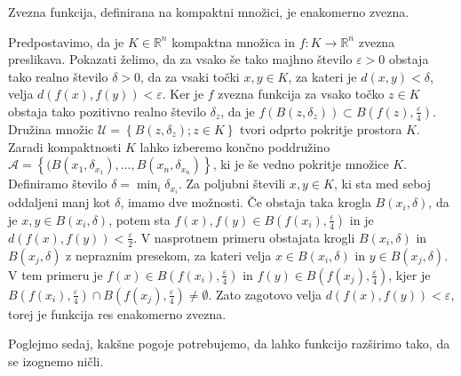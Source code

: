 \documentclass[mat1]{fmfdelo}
\newcommand{\R}{\mathbb R}
\newcommand{\0}{0}
\newcommand{\pA}{\mathcal A}
\newcommand{\pU}{\mathcal U}
\begin{document}
\begin{trditev}\label{trd:zvjeenakzv}
Zvezna funkcija, definirana na kompaktni množici, je enakomerno zvezna.
\end{trditev}
\begin{dokaz}
Predpostavimo, da je $K \in \R^n$ kompaktna množica in $f : K \to \R^n$ zvezna preslikava. Pokazati želimo, da za vsako še tako majhno število $\varepsilon > 0$ obstaja tako realno število $\delta > 0$, da za vsaki točki $x, y \in K$, za kateri je $d(x, y) < \delta$, velja $d(f(x), f(y)) < \varepsilon$. Ker je $f$ zvezna funkcija za vsako točko $z \in K$ obstaja tako pozitivno realno število $\delta_z$, da je $f(B(z, \delta_z)) \subset B(f(z), \frac{\varepsilon}{4})$. Družina množic $\pU = \left \{ B(z, \delta_z); z \in K \right \}$ tvori odprto pokritje prostora $K$. Zaradi kompaktnosti $K$ lahko izberemo končno poddružino $\pA =  \left \{ (B(x_1, \delta_{x_1}), \dots, B(x_n, \delta_{x_n}) \right \}$, ki je še vedno pokritje množice $K$. Definiramo število $\delta = \min_i \delta_{x_i}$. Za poljubni števili $x, y \in K$, ki sta med seboj oddaljeni manj kot $\delta$, imamo dve možnosti. Če obstaja taka krogla $B(x_i, \delta)$, da je $x, y \in B(x_i, \delta)$, potem sta $f(x), f(y) \in B(f(x_i), \frac{\varepsilon}{4})$ in je $d(f(x), f(y)) < \frac{\varepsilon}{2}$. V nasprotnem primeru obstajata krogli  $B(x_i, \delta)$ in $B(x_j, \delta)$ z nepraznim presekom, za kateri velja $x \in B(x_i, \delta)$ in $y \in B(x_j, \delta)$. V tem primeru je $f(x) \in B(f(x_i), \frac{\varepsilon}{4})$ in $f(y) \in B(f(x_j), \frac{\varepsilon}{4})$, kjer je $B(f(x_i), \frac{\varepsilon}{4}) \cap B(f(x_j), \frac{\varepsilon}{4}) \neq \emptyset$. Zato zagotovo velja $d(f(x), f(y)) < \varepsilon$, torej je funkcija res enakomerno zvezna.
\end{dokaz}
Poglejmo sedaj, kakšne pogoje potrebujemo, da lahko funkcijo razširimo tako, da se izognemo ničli.

\end{document}

